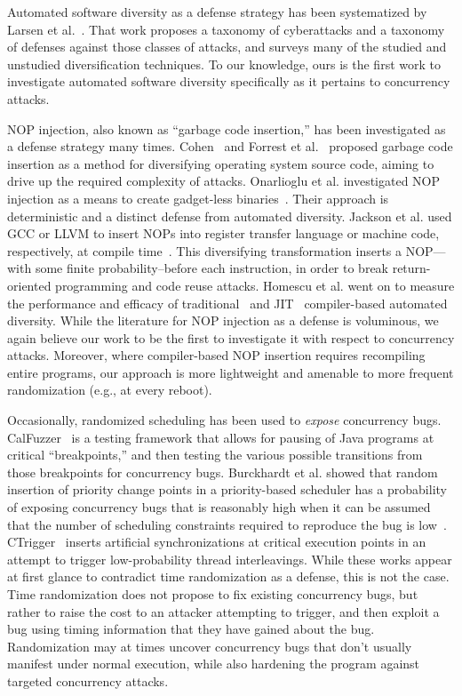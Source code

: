 Automated software diversity as a defense strategy has been systematized by Larsen et al.~\cite{Larsen2014}.
That work proposes a taxonomy of cyberattacks and a taxonomy of defenses against those classes of attacks, and surveys many of the studied and unstudied diversification techniques.
To our knowledge, ours is the first work to investigate automated software diversity specifically as it pertains to concurrency attacks.

NOP injection, also known as ``garbage code insertion,'' has been investigated as a defense strategy many times.
Cohen~\cite{Cohen1993} and Forrest et al.~\cite{Forrest1997} proposed garbage
code insertion as a method for diversifying operating system source code,
aiming to drive up the required complexity of attacks.
Onarlioglu et al. investigated NOP injection as a means to create gadget-less binaries~\cite{Onarlioglu2010}.
Their approach is deterministic and a distinct defense from automated diversity.
Jackson et al. used GCC or LLVM to insert NOPs into register transfer language or machine code, respectively, at compile time~\cite{Jackson2013}.
This diversifying transformation inserts a NOP---with some finite probability--before each instruction, in order to break return-oriented programming and code reuse attacks.
Homescu et al. went on to measure the performance and efficacy of traditional~\cite{Homescu2013a} and JIT~\cite{Homescu2013} compiler-based automated diversity.
While the literature for NOP injection as a defense is voluminous, we again believe our work to be the first to investigate it with respect to concurrency attacks.
Moreover, where compiler-based NOP insertion requires recompiling entire programs, our approach is more lightweight and amenable to more frequent randomization (e.g., at every reboot).

Occasionally, randomized scheduling has been used to \textit{expose} concurrency bugs.
CalFuzzer~\cite{Joshi2009} is a testing framework that allows for pausing of Java programs at critical ``breakpoints,'' and then testing the various possible transitions from those breakpoints for concurrency bugs.
Burckhardt et al. showed that random insertion of priority change points in a priority-based scheduler has a probability of exposing concurrency bugs that is reasonably high when it can be assumed that the number of scheduling constraints required to reproduce the bug is low~\cite{Burckhardt2010}.
CTrigger~\cite{Park2009} inserts artificial synchronizations at critical execution points in an attempt to trigger low-probability thread interleavings.
While these works appear at first glance to contradict time randomization as a defense, this is not the case.
Time randomization does not propose to fix existing concurrency bugs, but rather to raise the cost to an attacker attempting to trigger, and then exploit a bug using timing information that they have gained about the bug.
Randomization may at times uncover concurrency bugs that don't usually manifest under normal execution, while also hardening the program against targeted concurrency attacks.
